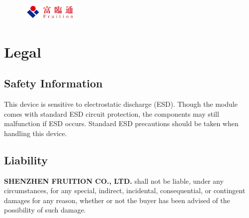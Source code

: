 \documentclass{scrreprt}
\newcommand{\pchapter}[1]{
	\begingroup\let\clearpage\relax
	\newpage
	\begin{figure}[H]
		\includegraphics[width=0.25\textwidth]{logo.jpeg}
	\end{figure}
	\chapter{#1}
	\endgroup
}
\begin{document}
\begin{CJK*}{UTF8}{gbsn}
\pchapter{Legal}
\section{Safety Information}
This device is sensitive to electrostatic discharge (ESD). Though the module
comes with standard ESD circuit protection, the components may still malfunction
if ESD occurs. Standard ESD precautions should be taken when handling this
device.

\section{Liability}
\textbf{SHENZHEN FRUITION CO., LTD.} shall not be liable, under any
circumstances, for any special, indirect, incidental, consequential, or
contingent damages for any reason, whether or not the buyer has been advised of
the possibility of such damage.

\end{CJK*}
\end{document}
